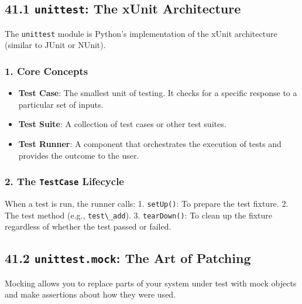 \hypertarget{unittest-the-xunit-architecture}{%
\subsection{\texorpdfstring{41.1 \texttt{unittest}: The xUnit
Architecture}{41.1 unittest: The xUnit Architecture}}\label{unittest-the-xunit-architecture}}

The \passthrough{\lstinline!unittest!} module is Python's implementation
of the xUnit architecture (similar to JUnit or NUnit).

\hypertarget{core-concepts}{%
\subsubsection{1. Core Concepts}\label{core-concepts}}

\begin{itemize}
\tightlist
\item
  \textbf{Test Case}: The smallest unit of testing. It checks for a
  specific response to a particular set of inputs.
\item
  \textbf{Test Suite}: A collection of test cases or other test suites.
\item
  \textbf{Test Runner}: A component that orchestrates the execution of
  tests and provides the outcome to the user.
\end{itemize}

\hypertarget{the-testcase-lifecycle}{%
\subsubsection{\texorpdfstring{2. The \texttt{TestCase}
Lifecycle}{2. The TestCase Lifecycle}}\label{the-testcase-lifecycle}}

When a test is run, the runner calls: 1.
\passthrough{\lstinline!setUp()!}: To prepare the test fixture. 2. The
test method (e.g., \passthrough{\lstinline!test\_add!}). 3.
\passthrough{\lstinline!tearDown()!}: To clean up the fixture regardless
of whether the test passed or failed.

\hypertarget{unittest.mock-the-art-of-patching}{%
\subsection{\texorpdfstring{41.2 \texttt{unittest.mock}: The Art of
Patching}{41.2 unittest.mock: The Art of Patching}}\label{unittest.mock-the-art-of-patching}}

Mocking allows you to replace parts of your system under test with mock
objects and make assertions about how they were used.

